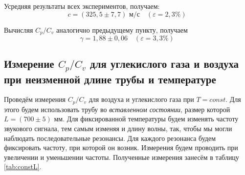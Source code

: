 \documentclass[a4paper, 12pt]{article}
\begin{document}
            \noindent Усредняя результаты всех экспериментов, получаем:
            \[ \boxed{c=(325,5 \pm 7,7)  \text{ м/с}} \quad (\varepsilon=2,3\%)\]

            \noindent Вычисляя $C_p/C_v$ аналогично предыдущему пункту, получаем
            \[ \boxed{\gamma = 1,88 \pm 0,06}\quad (\varepsilon=3,3\%) \]

        \subsection*{Измерение $C_p/C_v$ для углекислого газа и воздуха при неизменной длине трубы и температуре}
        
            \noindent Проведём измерения $C_p/C_v$ для воздуха и углекислого газа при $T = const$. Для этого будем использовать трубу во \textit{вставленном состоянии}, размер которой $ L = (700 \pm 5) $ мм. Для фиксированной температуры будем изменять частоту звукового сигнала, тем самым изменяя и длину волны, так, чтобы мы могли наблюдать последовательные резонансы. Для каждого резонанса будем фиксировать частоту, при которой он возник. Измерения будем проводить при увеличении и уменьшении частоты. Полученные измерения занесём в таблицу \ref{tab:constL}.
\end{document}
